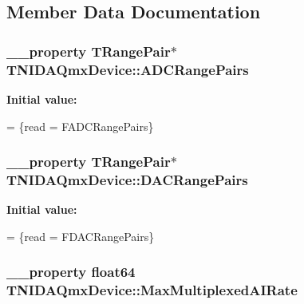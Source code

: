 \subsection{Member Data Documentation}
\hypertarget{class_t_n_i_d_a_qmx_device_a86151ddb7859fae98265e8b6df8467a8}{
\subsubsection[{A\+D\+C\+Range\+Pairs}]{\setlength{\rightskip}{0pt plus 5cm}\+\_\+\+\_\+property {\bf T\+Range\+Pair}$\ast$ T\+N\+I\+D\+A\+Qmx\+Device\+::\+A\+D\+C\+Range\+Pairs}}\label{class_t_n_i_d_a_qmx_device_a86151ddb7859fae98265e8b6df8467a8}
{\bfseries Initial value\+:}
\begin{DoxyCode}
=
                \{read = FADCRangePairs\}
\end{DoxyCode}
\hypertarget{class_t_n_i_d_a_qmx_device_ac1db4e5761f1f5e1a228f7757c8df0ec}{
\subsubsection[{D\+A\+C\+Range\+Pairs}]{\setlength{\rightskip}{0pt plus 5cm}\+\_\+\+\_\+property {\bf T\+Range\+Pair}$\ast$ T\+N\+I\+D\+A\+Qmx\+Device\+::\+D\+A\+C\+Range\+Pairs}}\label{class_t_n_i_d_a_qmx_device_ac1db4e5761f1f5e1a228f7757c8df0ec}
{\bfseries Initial value\+:}
\begin{DoxyCode}
=
                \{read = FDACRangePairs\}
\end{DoxyCode}
\hypertarget{class_t_n_i_d_a_qmx_device_a875cc22ee855e99a7d341e7d8019130e}{
\subsubsection[{Max\+Multiplexed\+A\+I\+Rate}]{\setlength{\rightskip}{0pt plus 5cm}\+\_\+\+\_\+property float64 T\+N\+I\+D\+A\+Qmx\+Device\+::\+Max\+Multiplexed\+A\+I\+Rate}}\label{class_t_n_i_d_a_qmx_device_a875cc22ee855e99a7d341e7d8019130e}
